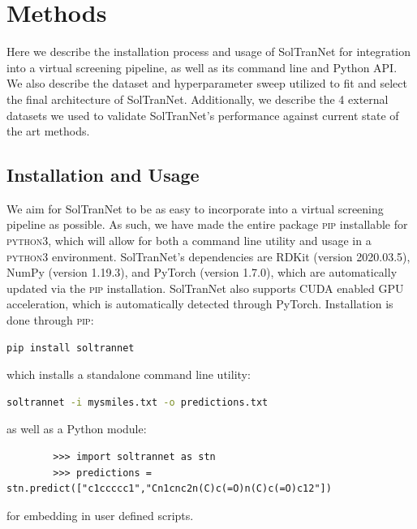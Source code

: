 \documentclass[journal=jmcmar,manuscript=article]{achemso}
\begin{document}
\section{Methods}

Here we describe the installation process and usage of SolTranNet for integration into a virtual screening pipeline, as well as its command line and Python API.
We also describe the dataset and hyperparameter sweep utilized to fit and select the final architecture of SolTranNet.
Additionally, we describe the 4 external datasets we used to validate SolTranNet's performance against current state of the art methods.

\subsection{Installation and Usage}
We aim for SolTranNet to be as easy to incorporate into a virtual screening pipeline as possible.
As such, we have made the entire package \textsc{\textsc{pip}} installable for \textsc{python3}, which will allow for both a command line utility and usage in a \textsc{python3} environment. 
SolTranNet's dependencies are RDKit\cite{rdkit} (version 2020.03.5),  NumPy\cite{numpy} (version 1.19.3), and PyTorch\cite{pytorch} (version 1.7.0), which are automatically updated via the \textsc{pip} installation.
SolTranNet also supports CUDA enabled GPU acceleration, which is automatically detected through PyTorch.  Installation is done through \textsc{pip}: \\
        \begin{lstlisting}[frame=none,language=bash]
 pip install soltrannet
        \end{lstlisting}
which installs a standalone command line utility:
        \begin{lstlisting}[frame=none,language=bash]
soltrannet -i mysmiles.txt -o predictions.txt
        \end{lstlisting}
as well as a Python module:
        \begin{verbatim}
        >>> import soltrannet as stn
        >>> predictions = stn.predict(["c1ccccc1","Cn1cnc2n(C)c(=O)n(C)c(=O)c12"])
        \end{verbatim}
 for embedding in user defined scripts.
\end{document}

